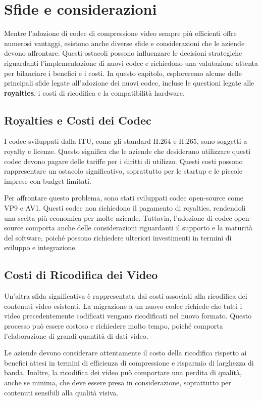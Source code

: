 \documentclass[a4paper,12pt, oneside]{article}
\begin{document}
\section{Sfide e considerazioni}
Mentre l'adozione di codec di compressione video sempre più efficienti offre numerosi vantaggi,
esistono anche diverse sfide e considerazioni che le aziende devono affrontare. Questi ostacoli
possono influenzare le decisioni strategiche riguardanti l'implementazione di nuovi codec e
richiedono una valutazione attenta per bilanciare i benefici e i costi. In questo capitolo,
esploreremo alcune delle principali sfide legate all'adozione dei nuovi codec, incluse le
questioni legate alle \textbf{royalties}, i costi di ricodifica e la compatibilità hardware.

\subsection{Royalties e Costi dei Codec}
I codec sviluppati dalla ITU, come gli standard H.264 e H.265, sono soggetti a royalty e
licenze. Questo significa che le aziende che desiderano utilizzare questi codec devono pagare
delle tariffe per i diritti di utilizzo. Questi costi possono rappresentare un ostacolo
significativo, soprattutto per le startup e le piccole imprese con budget limitati.

Per affrontare questo problema, sono stati sviluppati codec open-source come VP9 e AV1. Questi
codec non richiedono il pagamento di royalties, rendendoli una scelta più economica per molte
aziende. Tuttavia, l'adozione di codec open-source comporta anche delle considerazioni riguardanti
il supporto e la maturità del software, poiché possono richiedere ulteriori investimenti in termini
di sviluppo e integrazione.

\subsection{Costi di Ricodifica dei Video}
Un'altra sfida significativa è rappresentata dai costi associati alla ricodifica dei contenuti
video esistenti. La migrazione a un nuovo codec richiede che tutti i video precedentemente
codificati vengano ricodificati nel nuovo formato. Questo processo può essere costoso e richiedere
molto tempo, poiché comporta l'elaborazione di grandi quantità di dati video.

Le aziende devono considerare attentamente il costo della ricodifica rispetto ai benefici attesi
in termini di efficienza di compressione e risparmio di larghezza di banda. Inoltre, la ricodifica
dei video può comportare una perdita di qualità, anche se minima, che deve essere presa in considerazione,
soprattutto per contenuti sensibili alla qualità visiva.
\end{document}
